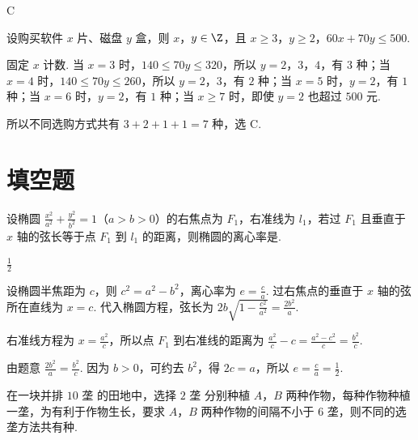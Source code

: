 \documentclass[UTF8,a4paper,oneside,11pt]{ctexbook}
\begin{document}
\begin{answer}
C
\end{answer}

\begin{solution}
设购买软件 \(x\) 片、磁盘 \(y\) 盒，则 \(x\)，\(y\in\Z\)，且
\(x\geqslant3\)，\(y\geqslant2\)，\(60x+70y\leqslant500\).

固定 \(x\) 计数. 当 \(x=3\) 时，\(140\leqslant70y\leqslant320\)，所以 \(y=2\)，\(3\)，\(4\)，有 \(3\) 种；当 \(x=4\) 时，\(140\leqslant70y\leqslant260\)，所以 \(y=2\)，\(3\)，有 \(2\) 种；当 \(x=5\) 时，\(y=2\)，有 \(1\) 种；当 \(x=6\) 时，\(y=2\)，有 \(1\) 种；当 \(x\geqslant7\) 时，即使 \(y=2\) 也超过 \(500\) 元.

所以不同选购方式共有 \(3+2+1+1=7\) 种，选 C.
\end{solution}

\section{填空题}

\begin{problem}
设椭圆 \(\frac{x^2}{a^2}+\frac{y^2}{b^2}=1\)（\(a>b>0\)）的右焦点为 \(F_1\)，右准线为 \(l_1\)，若过 \(F_1\) 且垂直于 \(x\) 轴的弦长等于点 \(F_1\) 到 \(l_1\) 的距离，则椭圆的离心率是\fillinblank{}.
\end{problem}

\begin{answer}
\(\frac{1}{2}\)
\end{answer}

\begin{solution}
设椭圆半焦距为 \(c\)，则 \(c^2=a^2-b^2\)，离心率为 \(e=\frac{c}{a}\). 过右焦点的垂直于 \(x\) 轴的弦所在直线为 \(x=c\). 代入椭圆方程，弦长为
\(2b\sqrt{1-\frac{c^2}{a^2}}=\frac{2b^2}{a}\).

右准线方程为 \(x=\frac{a^2}{c}\)，所以点 \(F_1\) 到右准线的距离为
\(\frac{a^2}{c}-c=\frac{a^2-c^2}{c}=\frac{b^2}{c}\).

由题意 \(\frac{2b^2}{a}=\frac{b^2}{c}\). 因为 \(b>0\)，可约去 \(b^2\)，得 \(2c=a\)，所以 \(e=\frac ca=\frac12\).
\end{solution}

\begin{problem}
在一块并排 \(10\text{ 垄}\) 的田地中，选择 \(2\text{ 垄}\) 分别种植 \(A\)，\(B\) 两种作物，每种作物种植一垄，为有利于作物生长，要求 \(A\)，\(B\) 两种作物的间隔不小于 \(6\text{ 垄}\)，则不同的选垄方法共有\fillinblank{}\(\text{种}\).
\end{problem}
\end{document}
